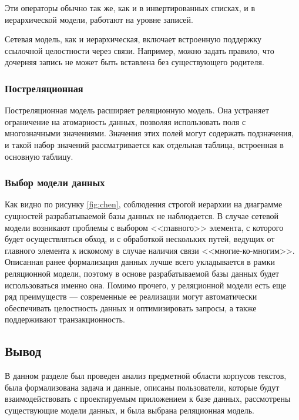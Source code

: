 Эти операторы обычно так же, как и в инвертированных списках, и в иерархической модели, работают на уровне записей.

Сетевая модель, как и иерархическая, включает встроенную поддержку ссылочной целостности через связи.
Например, можно задать правило, что дочерняя запись не может быть вставлена без существующего родителя.~\cite[с. 452]{date-wr}

\subsubsection{Постреляционная}

Постреляционная модель расширяет реляционную модель.
Она устраняет ограничение на атомарность данных, позволяя использовать поля с многозначными значениями.
Значения этих полей могут содержать подзначения, и такой набор значений рассматривается как отдельная таблица, встроенная в основную таблицу.~\cite{lecnotes} %

\subsubsection{Выбор модели данных}

Как видно по рисунку \ref{fig:chen}, соблюдения строгой иерархии на диаграмме сущностей разрабатываемой базы данных не наблюдается.
В случае сетевой модели возникают проблемы с выбором <<главного>> элемента, с которого будет осуществляться обход, и с обработкой нескольких путей, ведущих от главного элемента к искомому в случае наличия связи <<многие-ко-многим>>.
Описанная ранее формализация данных лучше всего укладывается в рамки реляционной модели, поэтому в основе разрабатываемой базы данных будет использоваться именно она.
Помимо прочего, у реляционной модели есть еще ряд преимуществ --- современные ее реализации могут автоматически обеспечивать целостность данных и оптимизировать запросы, а также поддерживают транзакционность.

\subsection{Вывод}

В данном разделе был проведен анализ предметной области корпусов текстов, была формализована задача и данные, описаны пользователи, которые будут взаимодействовать с проектируемым приложением к базе данных, рассмотрены существующие модели данных, и была выбрана реляционная модель.
